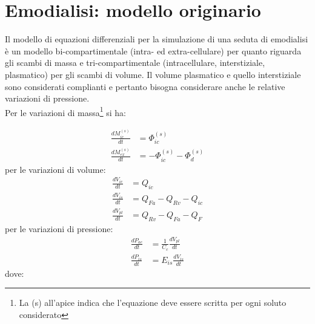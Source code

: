 
\chapter{Emodialisi: modello originario}
Il modello di equazioni differenziali  per la simulazione di una seduta di emodialisi è un modello bi-compartimentale (intra- ed extra-cellulare) per quanto riguarda gli scambi di massa e tri-compartimentale (intracellulare, interstiziale, plasmatico) per gli scambi di volume. Il volume plasmatico e quello interstiziale sono considerati complianti e pertanto bisogna considerare anche le relative variazioni di pressione.\\
\newline
Per le variazioni di massa\footnote{La (s) all'apice indica che l'equazione deve essere scritta per ogni soluto considerato} si ha:

\begin{align}
		\frac{dM_{ic}^{(s)}}{dt} &= \Phi_{ic}^{(s)}                \label{dMic}\\
		\frac{dM_{ex}^{(s)}}{dt} &= -\Phi_{ic}^{(s)} -\Phi_d^{(s)} \label{dMex}
\end{align}
\newline
per le variazioni di volume:
\begin{align}
		\frac{dV_{ic}}{dt} &= Q_{ic}\\
		\frac{dV_{is}}{dt} &= Q_{Fa} -Q_{Rv} -Q_{ic}\\
		\frac{dV_{pl}}{dt} &= Q_{Rv}-Q_{Fa} -Q_{F}
\end{align}
\newline
per le variazioni di pressione:
\begin{align}
		\frac{dP_{ac}}{dt} &= \frac{1}{C_c} \frac{dV_{pl}}{dt}\\
		\frac{dP_{is}}{dt} &= E_{is}\frac{dV_{is}}{dt}
\end{align}
\newline
dove:


